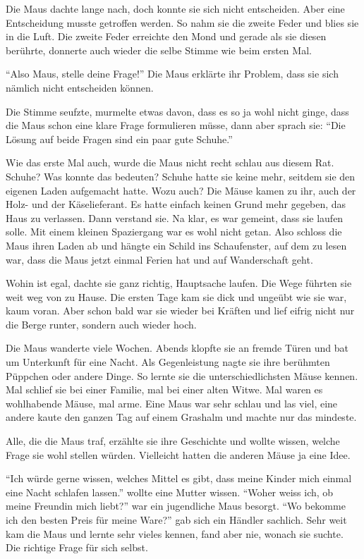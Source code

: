 Die Maus dachte lange nach, doch konnte sie sich nicht entscheiden. Aber eine Entscheidung musste getroffen werden.  So nahm sie die zweite Feder und blies sie in die Luft. Die zweite Feder erreichte den Mond und gerade als sie diesen berührte, donnerte auch wieder die selbe Stimme wie beim ersten Mal.

\enquote{Also Maus, stelle deine Frage!} Die Maus erklärte ihr Problem, dass sie sich nämlich nicht entscheiden können.

Die Stimme seufzte, murmelte etwas davon, dass es so ja wohl nicht ginge, dass die Maus schon eine klare Frage formulieren müsse, dann aber sprach sie: \enquote{Die Lösung auf beide Fragen sind ein paar gute Schuhe.}

Wie das erste Mal auch, wurde die Maus nicht recht schlau aus diesem Rat. Schuhe? Was konnte das bedeuten? Schuhe hatte sie keine mehr, seitdem sie den eigenen Laden aufgemacht hatte. Wozu auch? Die Mäuse kamen zu ihr, auch der Holz- und der Käselieferant. Es hatte einfach keinen Grund mehr gegeben, das Haus zu verlassen. Dann verstand sie. Na klar, es war gemeint, dass sie laufen solle. Mit einem kleinen Spaziergang war es wohl nicht getan. Also schloss die Maus ihren Laden ab und hängte ein Schild ins Schaufenster, auf dem zu lesen war, dass die Maus jetzt einmal Ferien hat und auf Wanderschaft geht.

Wohin ist egal, dachte sie ganz richtig, Hauptsache laufen. Die Wege führten sie weit weg von zu Hause. Die ersten Tage kam sie dick und ungeübt wie sie war, kaum voran. Aber schon bald war sie wieder bei Kräften und lief eifrig nicht nur die Berge runter, sondern auch wieder hoch.

Die Maus wanderte viele Wochen. Abends klopfte sie an fremde Türen und bat um Unterkunft für eine Nacht. Als Gegenleistung nagte sie ihre berühmten Püppchen oder andere Dinge. So lernte sie die unterschiedlichsten Mäuse kennen. Mal schlief sie bei einer Familie, mal bei einer alten Witwe. Mal waren es wohlhabende Mäuse, mal arme. Eine Maus war sehr schlau und las viel, eine andere kaute den ganzen Tag auf einem Grashalm und machte nur das mindeste.

Alle, die die Maus traf, erzählte sie ihre Geschichte und wollte wissen, welche Frage sie wohl stellen würden. Vielleicht hatten die anderen Mäuse ja eine Idee.

\enquote{Ich würde gerne wissen, welches Mittel es gibt, dass meine Kinder mich einmal eine Nacht schlafen lassen.} wollte eine Mutter wissen. \enquote{Woher weiss ich, ob meine Freundin mich liebt?} war ein jugendliche Maus besorgt. \enquote{Wo bekomme ich den besten Preis für meine Ware?} gab sich ein Händler sachlich. Sehr weit kam die Maus und lernte sehr vieles kennen, fand aber nie, wonach sie suchte. Die richtige Frage für sich selbst.

